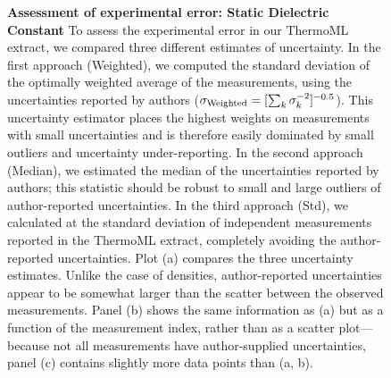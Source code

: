 \documentclass[journal=jacsat,manuscript=article]{achemso}
\begin{document}
\begin{figure}



\caption{{\bf Assessment of experimental error: Static Dielectric Constant}
To assess the experimental error in our ThermoML extract, we compared three different estimates of uncertainty.  
In the first approach (Weighted), we computed the standard deviation of the optimally weighted average of the measurements, using the uncertainties reported by authors ($\sigma_\textnormal{Weighted} = [\sum_k \sigma_k^{-2}]^{-0.5}$).
This uncertainty estimator places the highest weights on measurements with small uncertainties and is therefore easily dominated by small outliers and uncertainty under-reporting.
In the second approach (Median), we estimated the median of the uncertainties reported by authors; this statistic should be robust to small and large outliers of author-reported uncertainties.
In the third approach (Std), we calculated at the standard deviation of independent measurements reported in the ThermoML extract, completely avoiding the author-reported uncertainties.
Plot (a) compares the three uncertainty estimates.
Unlike the case of densities, author-reported uncertainties appear to be somewhat larger than the scatter between the observed measurements.
Panel (b) shows the same information as (a) but as a function of the measurement index, rather than as a scatter plot---because not all measurements have author-supplied uncertainties, panel (c) contains slightly more data points than (a, b).  
}
\label{figure:ErrorAnalysisDielectric}

\end{figure}
\end{document}
